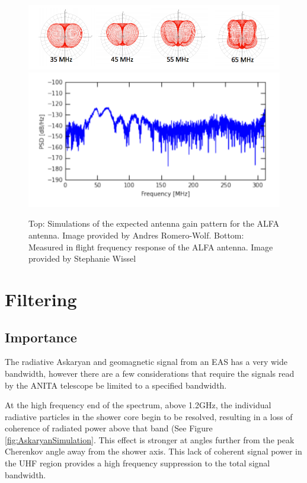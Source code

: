 \begin{figure}
\centering
	\includegraphics[width=\textwidth]{figures/ALFA_gainPattern}
	\includegraphics[width=\textwidth]{figures/ALFA_gain}
	\caption{Top: Simulations of the expected antenna gain pattern for the ALFA antenna.  Image provided by Andres Romero-Wolf.  Bottom: Measured in flight frequency response of the ALFA antenna.  Image provided by Stephanie Wissel}
	\label{fig:ALFA}
\end{figure}

	
\section{Filtering}
	\subsection{Importance}
		The radiative Askaryan and geomagnetic signal from an EAS has a very wide bandwidth, however there are a few considerations that require the signals read by the ANITA telescope be limited to a specified bandwidth.
		
		At the high frequency end of the spectrum, above 1.2GHz, the individual radiative particles in the shower core begin to be resolved, resulting in a loss of coherence of radiated power above that band (See Figure \ref{fig:AskaryanSimulation}.  This effect is stronger at angles further from the peak Cherenkov angle away from the shower axis.\cite{PhysRevD.84.103003}  This lack of coherent signal power in the UHF region provides a high frequency suppression to the total signal bandwidth.

